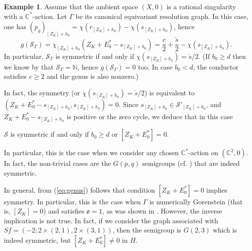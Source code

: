 \documentclass[12pt,a4paper]{amsart}
\def\cS{{\mathcal S}}
\theoremstyle{remark}
\theoremstyle{definition}
\newtheorem{exam}{Example}[section]
\begin{document}
\begin{exam}\label{ex:rat}
Assume that the ambient space $(X,0)$ is a rational singularity with a $\mathbb{C}^*$-action. Let $\Gamma$ be its canonical equivariant resolution graph. In this case, one has $(p_g)_{[Z_K]+h_0}=\chi(r_{[Z_K]+h_0})-\chi(s_{[Z_K]+h_0})$, hence 
\begin{equation}\label{eq:genusrat}
g(\cS_\Gamma)=\chi_{[Z_K]+h_0}(Z_K+E_0^*-s_{[Z_K]+h_0})=\frac{c}{2}+\frac{\check{s}}{2}-\chi(s_{[Z_K]+h_0}).
\end{equation}
In particular, $\cS_\Gamma$ is symmetric if and only if 
 $\chi(s_{[Z_K]+h_0})=\check{s}/2$.
(If $b_0\geq d$ then we know by \cite[6.2.2]{stronglyflat} that $\cS_\Gamma=\mathbb{N}$,
hence $g(\cS_\Gamma)=0$ too.  In case $b_0<d$, the conductor satisfies $c\geq 2$ and the genus is also nonzero.)

In fact, the symmetry (or  $\chi(s_{[Z_K]+h_0})=\check{s}/2$)
is equivalent to $(Z_K+E_0^*-s_{[Z_K]+h_0}, s_{[Z_K]+h_0})=0$. Since $s_{[Z_K]+h_0} \in \cS'_{[Z_K]+h_0}$, and $Z_K+E_0^*-s_{[Z_K]+h_0}$ is positive 
or the zero cycle, we deduce that in this case
\begin{center}
$\cS$ is symmetric if and only if $b_0\geq d$ or $[Z_K+E^*_0]=0$.
\end{center}
In particular, this is the case when we consider any chosen $\mathbb{C}^*$-action on $(\mathbb{C}^2,0)$. In fact, the non-trivial cases are the $G(p,q)$ semigroups (cf. \cite[3.2]{flat}) that are indeed symmetric. 
\end{exam}

In general, from (\ref{eq:genus}) follows that condition $[Z_K+E_0^*]=0$ implies symmetry. In particular, this is the case when $\Gamma$ is numerically Gorenstein (that is, $[Z_K]=0$) and satisfies $\mathfrak{o}=1$, as was shown in \cite[Prop.2.3.9]{flat}. However, the inverse implication is not true. In fact, if we consider the graph associated with $Sf=(-2;2\times (2,1), 2\times (3,1))$, then the semigroup is $G(2,3)$ which is indeed symmetric, but $[Z_K+E_0^*]\neq 0$ in $H$.   
\end{document}
